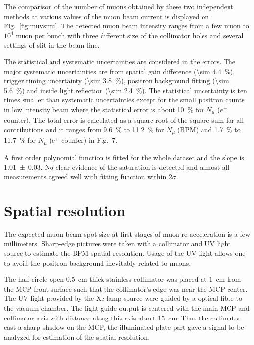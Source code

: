 \documentclass[preprint,3p,twocolumn]{elsarticle}
\begin{document}
The comparison of the number of muons obtained by these two independent methods at various values of the muon beam current is displayed on Fig.~\ref{fig:muvsmu}. The detected muon beam intensity ranges from a few muon to $10^{4}$ muon per bunch with three different size of the collimator holes and several settings of slit in the beam line.

The statistical and systematic uncertainties are considered in the errors. The major systematic uncertainties are from spatial gain difference (\SI{\sim 4.4}{\percent}), trigger timing uncertainty (\SI{\sim 3.8}{\percent}),
positron background fitting (\SI{\sim 5.6}{\percent}) and inside light reflection (\SI{\sim 2.4}{\percent}).
The statistical uncertainty is ten times smaller than systematic uncertainties except for the small positron counts in low intensity beam where the statistical error is about \SI{10}{\percent} for $N_\mu$ ($e^+$ counter).
The total error is calculated as a square root of the square sum for all contributions and it ranges from \SI{9.6}{\percent} to \SI{11.2}{\percent} for $N_\mu$ (BPM) and \SI{1.7}{\percent} to \SI{11.7}{\percent} for $N_\mu$ ($e^+$ counter) in Fig.~7.

A first order polynomial function is fitted for the whole dataset and the slope is \num{1.01 \pm 0.03}. No clear evidence of the saturation is detected and almost all measurements agreed well with fitting function within $2\sigma$.  

\section{Spatial resolution}
 
The expected muon beam spot size at first stages of muon re-acceleration is a few millimeters.
Sharp-edge pictures were taken with a collimator and UV light source to estimate the BPM spatial resolution.
Usage of the UV light allows one to avoid the positron background inevitably related to muons.

The half-circle open \SI{.5}{\cm} thick stainless collimator was placed at \SI{1}{\cm} from the MCP front surface
such that the collimator's edge was near the MCP center.
The UV light provided by the Xe-lamp source were guided by a optical fibre to the vacuum chamber.
The light guide output is centered with the main MCP and collimator axis
with distance along this axis about \SI{15}{\cm}.
Thus the collimator cast a sharp shadow on the MCP,
the illuminated plate part gave a signal to be analyzed for estimation of the spatial resolution.
\end{document}
